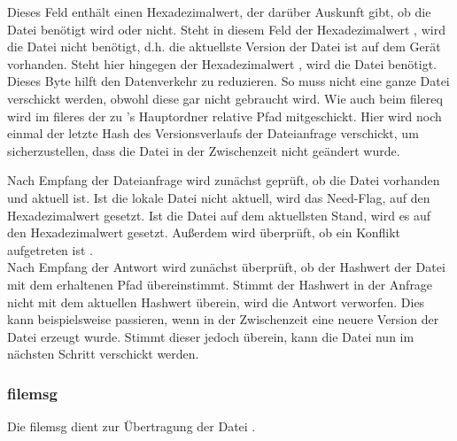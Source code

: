 \begin{description}
		Dieses Feld enthält einen Hexadezimalwert, der darüber Auskunft gibt, ob die Datei benötigt wird oder nicht. Steht in diesem Feld der Hexadezimalwert , wird die Datei nicht benötigt, d.h. die aktuellste Version der Datei ist auf dem Gerät vorhanden. Steht hier hingegen der Hexadezimalwert , wird die Datei benötigt. Dieses Byte hilft den Datenverkehr zu reduzieren. So muss nicht eine ganze Datei verschickt werden, obwohl diese gar nicht gebraucht wird.
		Wie auch beim \gls{filereq} wird im \gls{fileres} der zu \sblit's Hauptordner relative Pfad mitgeschickt.
		Hier wird noch einmal der letzte Hash des Versionsverlaufs der Dateianfrage verschickt, um sicherzustellen, dass die Datei in der Zwischenzeit nicht geändert wurde. 
\end{description}
Nach Empfang der Dateianfrage wird zunächst geprüft, ob die Datei vorhanden und aktuell ist. Ist die lokale Datei nicht aktuell, wird das Need-Flag, auf den Hexadezimalwert  gesetzt. Ist die Datei auf dem aktuellsten Stand, wird es auf den Hexadezimalwert  gesetzt. Außerdem wird überprüft, ob ein Konflikt aufgetreten ist .\\
Nach Empfang der Antwort wird zunächst überprüft, ob der Hashwert der Datei mit dem erhaltenen Pfad übereinstimmt. Stimmt der Hashwert in der Anfrage nicht mit dem aktuellen Hashwert überein, wird die Antwort verworfen. Dies kann beispielsweise passieren, wenn in der Zwischenzeit eine neuere Version der Datei erzeugt wurde. Stimmt dieser jedoch überein, kann die Datei nun im nächsten Schritt verschickt werden.
		
\subsubsection{\gls{filemsg}}
Die \gls{filemsg} dient zur Übertragung der Datei .
\messagestart
	 \\
	
	\begin{rightwordgroup}{\isprotomsgtype}
	\end{rightwordgroup} \\
	
